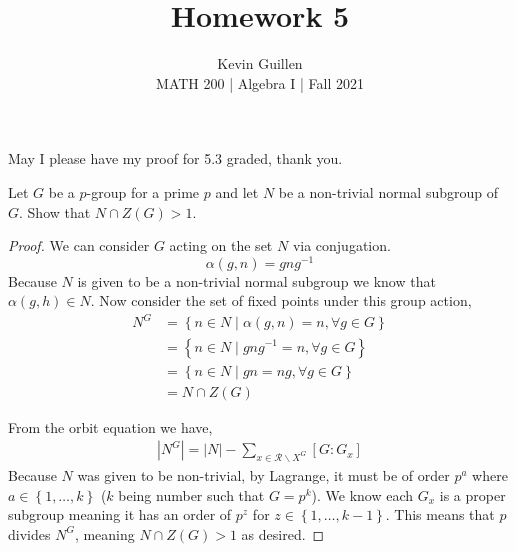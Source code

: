 \documentclass[11pt]{article}
\newenvironment{problem}[2][Problem\!]{\begin{trivlist}
\item[\hskip \labelsep {\bfseries #1}\hskip \labelsep {\bfseries #2}]}{\end{trivlist}}
\newcommand{\set}[1]{\left\{#1\right\}} %
\newcommand{\ord}[1]{{\left|#1\right|}}
\begin{document}
 
\title{Homework 5}
\author{Kevin Guillen\\[0.5em]
MATH 200 | Algebra I | Fall 2021}
\date{} 
\maketitle
May I please have my proof for 5.3 graded, thank you.
\begin{tcolorbox}
  \begin{problem} {5.2}
    Let $G$ be a $p$-group for a prime $p$ and let $N$ be a non-trivial normal subgroup of $G$. Show that $N \cap Z(G) > 1$.
  \end{problem}
\end{tcolorbox}
\begin{proof}
  We can consider $G$ acting on the set $N$ via conjugation. \[\alpha(g,n) = gng^{-1}\]
  Because $N$ is given to be a non-trivial normal subgroup we know that $\alpha(g,h)\in N$. Now consider the set of fixed points under this group action,
  \begin{align*}
    N^{G} &= \set{n \in N \mid \alpha(g,n) = n, \forall g \in G} \\
    &= \set{n \in N \mid gng^{-1} = n, \forall g \in G} \\
    &= \set{n \in N \mid gn = ng, \forall g \in G} \\
    &= N \cap Z(G)
  \end{align*}

  From the orbit equation we have,
  \begin{align*}
    \ord{N^{G}} = \ord{N} - \sum_{x\in \mathcal{R} \backslash X^{G}}[G : G_x] 
  \end{align*}
  Because $N$ was given to be non-trivial, by Lagrange, it must be of order $p^{a}$ where $a \in \set{1, \dots, k}$ ($k$ being number such that $G = p^{k}$). We know each $G_x$ is a proper subgroup meaning it has an order of $p^{z}$ for $z \in \set{1, \dots , k-1}$. This means that $p$ divides $N^{G}$, meaning $N\cap Z(G)>1$ as desired. 
\end{proof}
\end{document}
